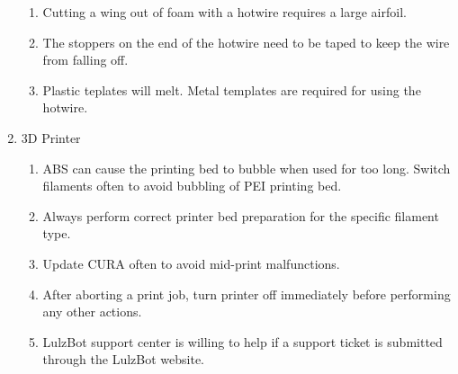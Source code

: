 ﻿\documentclass{article}
\begin{document}
\begin{enumerate}
\begin{enumerate}
\item Cutting a wing out of foam with a hotwire requires a large airfoil.
\item The stoppers on the end of the hotwire need to be taped to keep the wire from falling off.
\item Plastic teplates will melt. Metal templates are required for using the hotwire.
\end{enumerate}
\item 3D Printer
\begin{enumerate}
\item ABS can cause the printing bed to bubble when used for too long. Switch filaments often to avoid bubbling of PEI printing bed.
\item Always perform correct printer bed preparation for the specific filament type.
\item Update CURA often to avoid mid-print malfunctions.
\item After aborting a print job, turn printer off immediately before performing any other actions.
\item LulzBot support center is willing to help if a support ticket is submitted through the LulzBot website.
\end{enumerate}
\end{enumerate}

\end{document}
